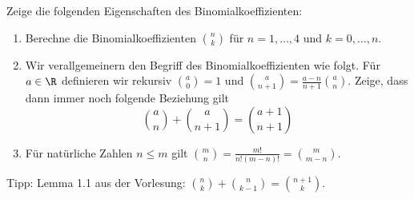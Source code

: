 \begin{exercise}[Binomialkoeffzienten]
  Zeige die folgenden Eigenschaften des Binomialkoeffizienten:
  \begin{enumerate}
  \item Berechne die Binomialkoeffizienten \(\binom{n}{k}\) für \(n = 1, \dots,
    4\) und \( k = 0, \dots ,n\).
  \item Wir verallgemeinern den Begriff des Binomialkoeffizienten wie folgt. Für
    $a \in \R$ definieren wir rekursiv $\binom{a}{0} = 1$ und $\binom{a}{n + 1}
    = \frac{a - n}{n + 1} \binom{a}{n}$. Zeige, dass dann immer noch folgende
    Beziehung gilt
    \[
      \binom{a}{n} + \binom{a}{n + 1}
      =
      \binom{a + 1}{n + 1}
    \]
    \item Für natürliche Zahlen $n \leq m$ gilt $\binom{m}{n} = \frac{m!}{n! (m
        - n)!} = \binom{m}{m - n}$.
  \end{enumerate}
  Tipp: Lemma 1.1 aus der Vorlesung: \(\binom{n}{k} + \binom{n}{k-1} =
  \binom{n+1}{k}\).
\end{exercise}
